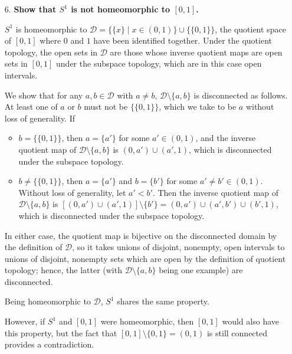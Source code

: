 \documentclass[a4paper,12pt]{article}
\begin{document}
\begin{enumerate}
    \item[6.]
        \boldmath\textbf{Show that $S^1$ is not homeomorphic to $[0, 1]$.
        }\unboldmath \par
        $S^1$ is homeomorphic to $\mathcal{D} = \{\{x\} \mid x \in (0, 1) \} \cup \{\{0, 1\}\}$, the quotient space of $[0, 1]$ where $0$ and $1$ have been identified together. Under the quotient topology, the open sets in $\mathcal{D}$ are those whose inverse quotient maps are open sets in $[0, 1]$ under the subspace topology, which are in this case open intervals. \par
        We show that for any $a, b \in \mathcal{D}$ with $a \neq b$, $\mathcal{D} \setminus \{ a, b \}$ is disconnected as follows. At least one of $a$ or $b$ must not be $\{\{0, 1\}\}$, which we take to be $a$ without loss of generality. If
        \begin{itemize}
            \item
                $b = \{\{0, 1\}\}$, then $a = \{a'\}$ for some $a' \in (0, 1)$, and the inverse quotient map of $\mathcal{D} \setminus \{ a, b \}$ is $(0, a') \cup (a', 1)$, which is disconnected under the subspace topology.
            \item
                $b \neq \{\{0, 1\}\}$, then $a = \{a'\}$ and $b = \{b'\}$ for some $a' \neq b' \in (0, 1)$. Without loss of generality, let $a' < b'$. Then the inverse quotient map of $\mathcal{D} \setminus \{ a, b \}$ is $[(0, a') \cup (a', 1)] \setminus \{ b' \} = (0, a') \cup (a', b') \cup (b', 1)$, which is disconnected under the subspace topology.
        \end{itemize}
        In either case, the quotient map is bijective on the disconnected domain by the definition of $\mathcal{D}$, so it takes unions of disjoint, nonempty, open intervals to unions of disjoint, nonempty sets which are open by the definition of quotient topology; hence, the latter (with $\mathcal{D} \setminus \{ a, b \}$ being one example) are disconnected. \par
        Being homeomorphic to $\mathcal{D}$, $S^1$ shares the same property. \par
        However, if $S^1$ and $[0, 1]$ were homeomorphic, then $[0, 1]$ would also have this property, but the fact that $[0, 1] \setminus \{ 0, 1 \} = (0, 1)$ is still connected provides a contradiction.


\end{enumerate}
\end{document}
